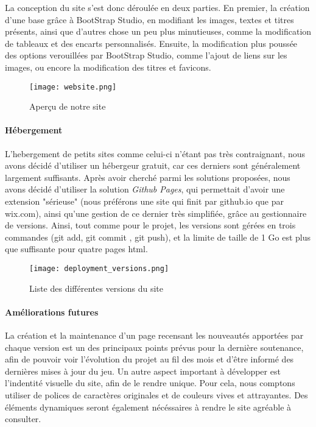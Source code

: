         La conception du site s'est donc déroulée en deux parties. En premier, la création
        d'une base grâce à BootStrap Studio, en modifiant les images, textes et titres présents, ainsi
        que d'autres chose un peu plus minutieuses, comme la modification de tableaux et des encarts personnalisés.
        Ensuite, la modification plus poussée des options verouillées par BootStrap Studio, comme l'ajout de liens 
        sur les images, ou encore la modification des titres et favicons.

        \begin{figure}[hbt!]
            \centering
            \texttt{[image: website.png]}
            \caption{Aperçu de notre site}
        \end{figure}
        \FloatBarrier


        \paragraph{Hébergement}

        L'hebergement de petits sites comme celui-ci n'étant pas très contraignant,
        nous avons décidé d'utiliser un hébergeur gratuit, car ces derniers
        sont généralement largement suffisants. Après avoir cherché parmi les
        solutions proposées, nous avons décidé d'utiliser la solution 
        \textit{Github Pages}, qui permettait d'avoir une extension "sérieuse"
        (nous préférons une site qui finit par github.io que par wix.com),
        ainsi qu'une gestion de ce dernier très simplifiée, grâce au gestionnaire de versions.
        Ainsi, tout comme pour le projet, les versions sont gérées en trois commandes 
        (git add, git commit , git push), et la limite de taille de 1 Go est plus que suffisante pour quatre pages html. 


        \begin{figure}[hbt!]
            \centering
            \texttt{[image: deployment\_versions.png]}
            \caption{Liste des différentes versions du site}
        \end{figure}
        \FloatBarrier

        
        \paragraph{Améliorations futures}

        La création et la maintenance d'un page recensant les nouveautés apportées par chaque version est un des 
        principaux points prévus pour la dernière soutenance, afin de pouvoir voir l'évolution du projet au fil des 
        mois et d'être informé des dernières mises à jour du jeu. Un autre aspect important à développer est l'indentité
        visuelle du site, afin de le rendre unique. Pour cela,  nous comptons utiliser de polices de caractères originales 
        et de couleurs vives et attrayantes. Des éléments dynamiques seront également nécéssaires à rendre le site agréable 
        à consulter.